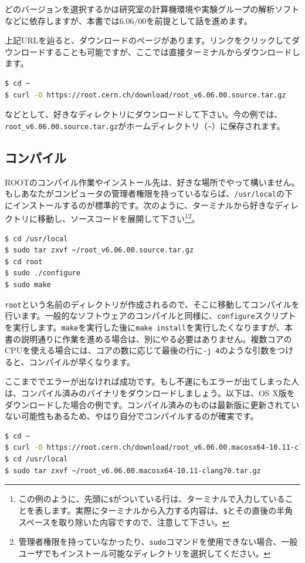 どのバージョンを選択するかは研究室の計算機環境や実験グループの解析ソフトなどに依存しますが、本書では6.06/00を前提として話を進めます。

上記URLを辿ると、ダウンロードのページがあります。リンクをクリックしてダウンロードすることも可能ですが、ここでは直接ターミナルからダウンロードします。
\begin{lstlisting}[language=bash]
$ cd ~
$ curl -O https://root.cern.ch/download/root_v6.06.00.source.tar.gz
\end{lstlisting}
などとして、好きなディレクトリにダウンロードして下さい。今の例では、\texttt{root\_v6.06.00.source.tar.gz}がホームディレクトリ（\texttt{\~}）に保存されます。

\subsection{コンパイル}
\label{subsec_compile}
ROOTのコンパイル作業やインストール先は、好きな場所でやって構いません。もしあなたがコンピュータの管理者権限を持っているならば、\texttt{/usr/local}の下にインストールするのが標準的です。次のように、ターミナルから好きなディレクトリに移動し、ソースコードを展開して下さい\footnote{この例のように、先頭に\texttt{\$}がついている行は、ターミナルで入力していることを表します。実際にターミナルから入力する内容は、\texttt{\$}とその直後の半角スペースを取り除いた内容ですので、注意して下さい。}\footnote{管理者権限を持っていなかったり、\texttt{sudo}コマンドを使用できない場合、一般ユーザでもインストール可能なディレクトリを選択してください。}。
\begin{lstlisting}[language=bash]
$ cd /usr/local
$ sudo tar zxvf ~/root_v6.06.00.source.tar.gz
$ cd root
$ sudo ./configure
$ sudo make
\end{lstlisting}
\texttt{root}という名前のディレクトリが作成されるので、そこに移動してコンパイルを行います。一般的なソフトウェアのコンパイルと同様に、\texttt{configure}スクリプトを実行します。\texttt{make}を実行した後に\texttt{make install}を実行したくなりますが、本書の説明通りに作業を進める場合は、別にやる必要はありません。複数コアのCPUを使える場合には、コアの数に応じて最後の行に\texttt{-j 4}のような引数をつけると、コンパイルが早くなります。

ここまででエラーが出なければ成功です。もし不運にもエラーが出てしまった人は、コンパイル済みのバイナリをダウンロードしましょう。以下は、OS X版をダウンロードした場合の例です。コンパイル済みのものは最新版に更新されていない可能性もあるため、やはり自分でコンパイルするのが確実です。
\begin{lstlisting}[language=bash]
$ cd ~
$ curl -O https://root.cern.ch/download/root_v6.06.00.macosx64-10.11-clang70.tar.gz
$ cd /usr/local
$ sudo tar zxvf ~/root_v6.06.00.macosx64-10.11-clang70.tar.gz
\end{lstlisting}

